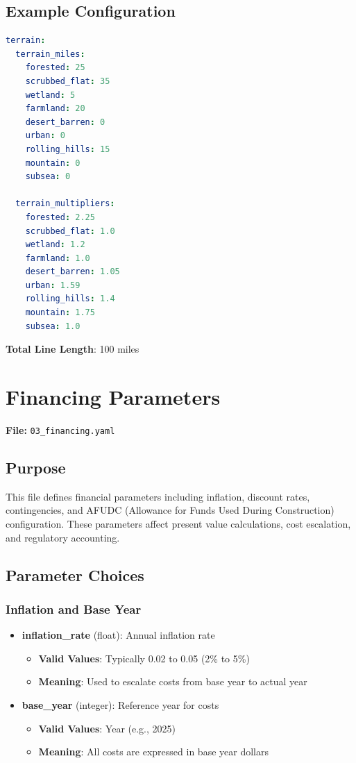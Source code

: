 \documentclass[ctcc_full_documentation.tex]{subfiles}
\begin{document}
\subsection{Example Configuration}

\begin{lstlisting}[language=yaml]
terrain:
  terrain_miles:
    forested: 25
    scrubbed_flat: 35
    wetland: 5
    farmland: 20
    desert_barren: 0
    urban: 0
    rolling_hills: 15
    mountain: 0
    subsea: 0

  terrain_multipliers:
    forested: 2.25
    scrubbed_flat: 1.0
    wetland: 1.2
    farmland: 1.0
    desert_barren: 1.05
    urban: 1.59
    rolling_hills: 1.4
    mountain: 1.75
    subsea: 1.0
\end{lstlisting}

\textbf{Total Line Length}: 100 miles

\section{Financing Parameters}
\label{sec:financing}

\textbf{File:} \texttt{03\_financing.yaml}

\subsection{Purpose}

This file defines financial parameters including inflation, discount rates, contingencies, and AFUDC (Allowance for Funds Used During Construction) configuration. These parameters affect present value calculations, cost escalation, and regulatory accounting.

\subsection{Parameter Choices}

\subsubsection{Inflation and Base Year}

\begin{itemize}
    \item \textbf{inflation\_rate} (float): Annual inflation rate
    \begin{itemize}
        \item \textbf{Valid Values}: Typically 0.02 to 0.05 (2\% to 5\%)
        \item \textbf{Meaning}: Used to escalate costs from base year to actual year
    \end{itemize}
    
    \item \textbf{base\_year} (integer): Reference year for costs
    \begin{itemize}
        \item \textbf{Valid Values}: Year (e.g., 2025)
        \item \textbf{Meaning}: All costs are expressed in base year dollars
    \end{itemize}
\end{itemize}
\end{document}
